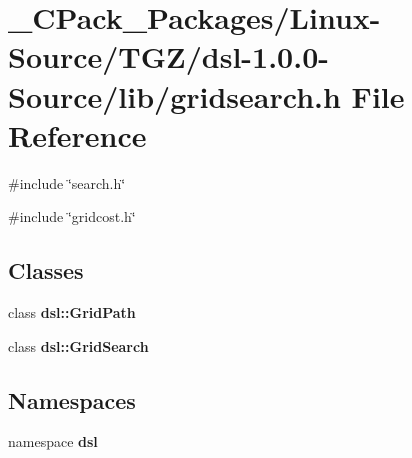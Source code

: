 \section{\_\-CPack\_\-Packages/Linux-\/Source/TGZ/dsl-\/1.0.0-\/Source/lib/gridsearch.h File Reference}
\label{__CPack__Packages_2Linux-Source_2TGZ_2dsl-1_80_80-Source_2lib_2gridsearch_8h}
{\ttfamily \#include \char`\"{}search.h\char`\"{}}\par
{\ttfamily \#include \char`\"{}gridcost.h\char`\"{}}\par
\subsection*{Classes}
\begin{DoxyCompactItemize}
\item 
class {\bf dsl::GridPath}
\item 
class {\bf dsl::GridSearch}
\end{DoxyCompactItemize}
\subsection*{Namespaces}
\begin{DoxyCompactItemize}
\item 
namespace {\bf dsl}
\end{DoxyCompactItemize}
